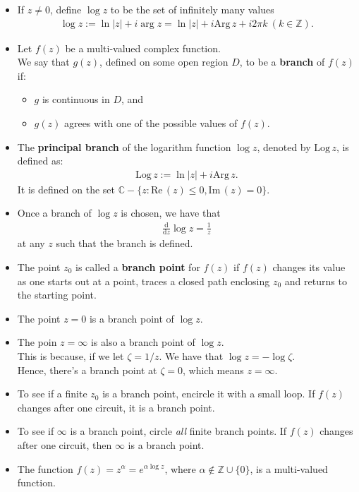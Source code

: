 \documentclass[10pt]{article}
\newcommand{\dee}{\mathrm{d}}
\newcommand{\Arg}{\mathrm{Arg\,}}
\newcommand{\Log}{\mathrm{Log\,}}
\newcommand{\RE}{\mathrm{Re\,}}
\newcommand{\IM}{\mathrm{Im\,}}
\begin{document}
  \begin{itemize}
    \item If $z \neq 0$, define $\log z$ to be the set of infinitely many values
    \begin{align*}
      \log z := \ln |z| + i \arg z = \ln |z| + i \Arg z + i2\pi k\ (k \in \mathbb{Z}).
    \end{align*}

    \item Let $f(z)$ be a multi-valued complex function.\\
    We say that $g(z)$, defined on some open region $D$, to be a {\bf branch} of $f(z)$ if:
    \begin{itemize}
      \item $g$ is continuous in $D$, and
      \item $g(z)$ agrees with one of the possible values of $f(z)$.
    \end{itemize}

    \item The {\bf principal branch} of the logarithm function $\log z$, denoted by $\Log z$, is defined as:
    \begin{align*}
      \Log z := \ln |z| + i \Arg z.
    \end{align*}
    It is defined on the set $\mathbb{C} - \{ z : \RE(z) \leq 0, \IM(z) = 0 \}$.

    \item Once a branch of $\log z$ is chosen, we have that
    \begin{align*}
      \frac{\dee}{\dee z} \log z = \frac{1}{z}
    \end{align*}
    at any $z$ such that the branch is defined.

    \item The point $z_0$ is called a {\bf branch point} for $f(z)$ if $f(z)$ changes its value as one starts out at a point, traces a closed path enclosing $z_0$ and returns to the starting point.    

    \item The point $z = 0$ is a branch point of $\log z$.

    \item The poin $z = \infty$ is also a branch point of $\log z$.\\
    This is because, if we let $\zeta = 1/z$. We have that $\log z = -\log \zeta$.\\
    Hence, there's a branch point at $\zeta = 0$, which means $z = \infty.$

    \item To see if a finite $z_0$ is a branch point, encircle it with a small loop. If $f(z)$ changes after one circuit, it is a branch point.

    \item To see if $\infty$ is a branch point, circle \emph{all} finite branch points. If $f(z)$ changes after one circuit, then $\infty$ is a branch point.

    \item The function $f(z) = z^\alpha = e^{\alpha \log z}$, where $\alpha \not\in \mathbb{Z} \cup \{ 0 \}$, is a multi-valued function.
  \end{itemize}  
\end{document}
